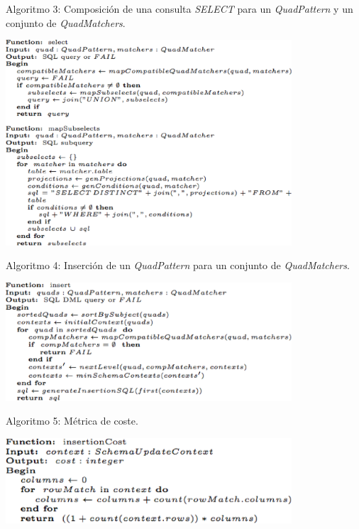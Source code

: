 \begin{table}
\vspace{2.4in}
\caption{Algoritmo 3: Composici\'on de una consulta \textit{SELECT} para un \textit{QuadPattern} y un conjunto de \textit{QuadMatchers}.}
\includegraphics[width=0.8\textwidth]{algoritmo3}
\label{alg3}
\end{table}
\clearpage
\newpage

\begin{table}
\vspace{2.4in}
\caption{Algoritmo 4: Inserci\'on de un \textit{QuadPattern} para un conjunto de \textit{QuadMatchers}.}
\includegraphics[width=0.8\textwidth]{algoritmo4}
\label{alg4}
\end{table}
\clearpage
\newpage


\begin{table}
\vspace{2.4in}
\caption{Algoritmo 5: M\'etrica de coste.}
\includegraphics[width=0.8\textwidth]{algoritmo5}
\label{alg5}
\end{table}
\clearpage
\newpage

